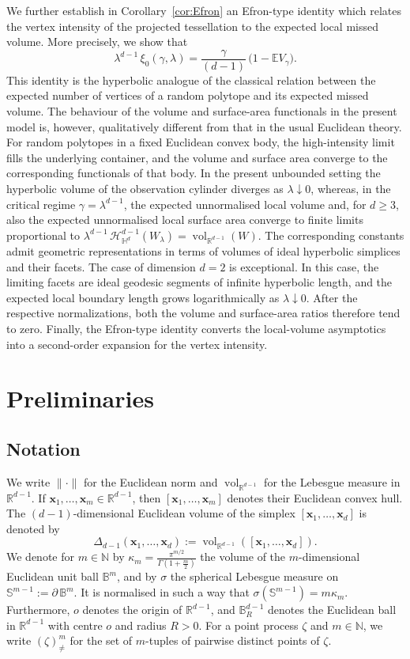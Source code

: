 \documentclass[11pt,a4paper]{article}
\theoremstyle{plain}
\theoremstyle{definition}
\theoremstyle{remark}
\newcommand{\vol}{\mathop{\mathrm{vol}}\nolimits}
\newcommand{\bx}{\boldsymbol{x}}
\def\BB{\mathbb{B}}
\def\EE{\mathbb{E}}
\def\HH{\mathbb{H}}
\def\NN{\mathbb{N}}
\def\RR{\mathbb{R}}
\def\SS{\mathbb{S}}
\begin{document}
We further establish in Corollary~\ref{cor:Efron} an Efron-type identity which relates the vertex
intensity of the projected tessellation to the expected local missed
volume. More precisely, we show that
\[
	\lambda^{d-1}\,\xi_0(\gamma,\lambda)
	=
	\frac{\gamma}{(d-1)}\,
	\bigl( 1 - \EE V_{\gamma}\bigr).
\]
This identity is the hyperbolic analogue of the classical relation between
the expected number of vertices of a random polytope and its expected missed
volume. The behaviour of the volume and surface-area functionals in the
present model is, however, qualitatively different from that in the usual
Euclidean theory. For random polytopes in a fixed Euclidean convex body,
the high-intensity limit fills the underlying container, and the volume and
surface area converge to the corresponding functionals of that body. In the
present unbounded setting the hyperbolic volume of the
observation cylinder diverges as $\lambda\downarrow0$, whereas, in the
critical regime $\gamma=\lambda^{d-1}$, the expected unnormalised local
volume and, for $d\ge3$, also the expected unnormalised local surface area
converge to finite limits proportional to
$\lambda^{d-1}\,\mathcal{H}_{\HH^d}^{d-1}(W_\lambda)=\vol_{\RR^{d-1}}(W)$. The corresponding constants admit geometric
representations in terms of volumes of ideal hyperbolic simplices and their
facets. The case of dimension $d=2$ is exceptional. In this case, the limiting facets are ideal geodesic
segments of infinite hyperbolic length, and the expected local boundary
length grows logarithmically as $\lambda\downarrow0$. After the
respective normalizations, both the volume and surface-area ratios
therefore tend to zero. Finally, the Efron-type identity converts the
local-volume asymptotics into a second-order expansion for the vertex
intensity.

\section{Preliminaries}\label{sec:Prelim}

\subsection{Notation}

We write $\|\cdot\|$ for the Euclidean norm and $\vol_{\RR^{d-1}}$ for the Lebesgue measure in $\RR^{d-1}$. If
$\bx_1,\ldots,\bx_m\in\RR^{d-1}$, then $[\bx_1,\ldots,\bx_m]$
denotes their Euclidean convex hull. The $(d-1)$-dimensional Euclidean
volume of the simplex $[\bx_1,\ldots,\bx_d]$ is denoted by
\[
	\Delta_{d-1}(\bx_1,\ldots,\bx_d)
	:=
	\vol_{\RR^{d-1}}([\bx_1,\ldots,\bx_d]).
\]
We denote for $m\in\NN$ by $\kappa_m=\frac{\pi^{m/2}}{\Gamma(1+\frac{m}{2})}$ the volume of the $m$-dimensional Euclidean unit ball $\BB^m$, and by $\sigma$ the spherical Lebesgue measure on
$\SS^{m-1}:=\partial\, \BB^m$. It is normalised in such a way that $\sigma(\SS^{m-1})=m\kappa_m$. Furthermore, $o$ denotes the origin of $\RR^{d-1}$, and
$\BB_R^{d-1}$ denotes the Euclidean ball in $\RR^{d-1}$ with centre $o$ and
radius $R>0$. For a point process $\zeta$ and $m\in\NN$, we write
$(\zeta)_{\neq}^m$ for the set of $m$-tuples of pairwise distinct points
of $\zeta$.
\end{document}
